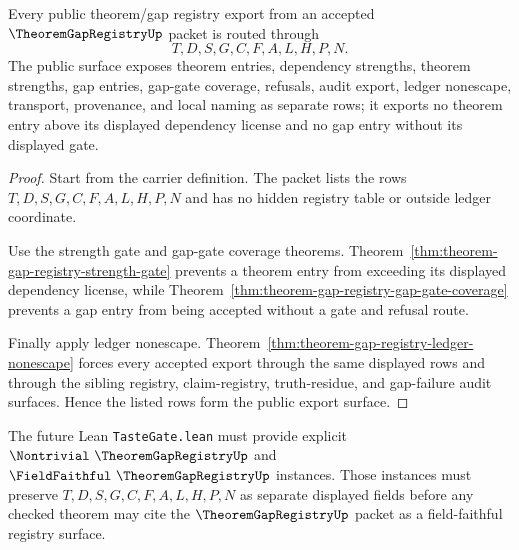 \begin{theorem}
\label{thm:theorem-gap-registry-public-export-surface}
Every public theorem/gap registry export from an accepted $\TheoremGapRegistryUp$ packet is routed through
$$
T,D,S,G,C,F,A,L,H,P,N.
$$
The public surface exposes theorem entries, dependency strengths, theorem strengths, gap entries, gap-gate coverage, refusals, audit export, ledger nonescape, transport, provenance, and local naming as separate rows; it exports no theorem entry above its displayed dependency license and no gap entry without its displayed gate.
\end{theorem}
\begin{proof}
Start from the carrier definition. The packet lists the rows $T,D,S,G,C,F,A,L,H,P,N$ and has no hidden registry table or outside ledger coordinate.

Use the strength gate and gap-gate coverage theorems. Theorem~\ref{thm:theorem-gap-registry-strength-gate} prevents a theorem entry from exceeding its displayed dependency license, while Theorem~\ref{thm:theorem-gap-registry-gap-gate-coverage} prevents a gap entry from being accepted without a gate and refusal route.

Finally apply ledger nonescape. Theorem~\ref{thm:theorem-gap-registry-ledger-nonescape} forces every accepted export through the same displayed rows and through the sibling registry, claim-registry, truth-residue, and gap-failure audit surfaces. Hence the listed rows form the public export surface.
\end{proof}



The future Lean \texttt{TasteGate.lean} must provide explicit $\Nontrivial\ \TheoremGapRegistryUp$ and $\FieldFaithful\ \TheoremGapRegistryUp$ instances. Those instances must preserve $T,D,S,G,C,F,A,L,H,P,N$ as separate displayed fields before any checked theorem may cite the $\TheoremGapRegistryUp$ packet as a field-faithful registry surface.


